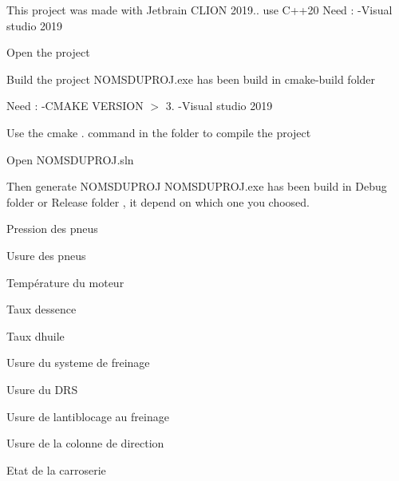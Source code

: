 This project was made with Jetbrain C\+L\+I\+ON 2019.. use C++20 Need \+: -\/\+Visual studio 2019


\begin{DoxyItemize}
\item Open the project
\item Build the project N\+O\+M\+S\+D\+U\+P\+R\+O\+J.\+exe has been build in cmake-\/build folder
\end{DoxyItemize}

Need \+: -\/\+C\+M\+A\+KE V\+E\+R\+S\+I\+ON $>$ 3. -\/\+Visual studio 2019


\begin{DoxyItemize}
\item Use the {\ttfamily cmake .} command in the folder to compile the project
\item Open N\+O\+M\+S\+D\+U\+P\+R\+O\+J.\+sln
\item Then generate N\+O\+M\+S\+D\+U\+P\+R\+OJ N\+O\+M\+S\+D\+U\+P\+R\+O\+J.\+exe has been build in Debug folder or Release folder , it depend on which one you choosed.
\end{DoxyItemize}


\begin{DoxyItemize}
\item Pression des pneus
\item Usure des pneus
\item Température du moteur
\item Taux d\textquotesingle{}essence
\item Taux d\textquotesingle{}huile
\item Usure du systeme de freinage
\item Usure du D\+RS
\item Usure de l\textquotesingle{}antiblocage au freinage
\item Usure de la colonne de direction
\item Etat de la carroserie 
\end{DoxyItemize}